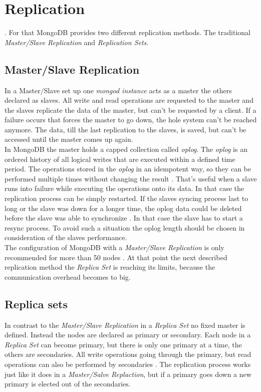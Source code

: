 \section{Replication}
. For that MongoDB provides two different replication methods. The traditional \textit{Master/Slave Replication} and \textit{Replication Sets}.

\subsection{Master/Slave Replication}
In a Master/Slave set up one \textit{mongod instance} acts as a master the others declared as slaves. All write and read operations are requested to the master and the slaves replicate the data of the master, but can't be requested by a client. If a failure occurs that forces the master to go down, the hole system can't be reached anymore. The data, till the last replication to the slaves, is saved, but can't be accessed until the master comes up again. \\
In MongoDB the master holds a capped collection called \textit{oplog}. The \textit{oplog} is an ordered history of all logical writes that are executed within a defined time period. The operations stored in the \textit{oplog} in an idempotent way, so they can be performed multiple times without changing the result \cite{pracmong}. That's useful when a slave runs into failure while executing the operations onto its data. In that case the replication process can be simply restarted. If the slaves syncing process last to long or the slave was down for a longer time, the oplog data could be deleted before the slave was able to synchronize \cite{pracmong}. In that case the slave has to start a resync process. To avoid such a situation the oplog length should be chosen in consideration of the slaves performance.\\
The configuration of MongoDB with a \textit{Master/Slave Replication} is only recommended for more than 50 nodes \cite{pracmong}. At that point the next described replication method the \textit{Replica Set} is reaching its limits, because the communication overhead becomes to big.

\subsection{Replica sets}
In contrast to the \textit{Master/Slave Replication} in a \textit{Replica Set} no fixed master is defined. Instead the nodes are declared as primary or secondary. Each node in a \textit{Replica Set} can become primary, but there is only one primary at a time, the others are secondaries. All write operations going through the primary, but read operations can also be performed by secondaries \cite{pracmong}. The replication process works just like it does in a \textit{Master/Salve Replaction}, but if a primary goes down a new primary is elected out of the secondaries.

